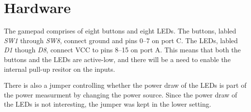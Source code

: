 \section{Hardware}
The gamepad comprises of eight buttons and eight LEDs.
The buttons, labled \emph{SW1} through \emph{SW8}, connect ground and pins 0--7 on port C.
The LEDs, labled \emph{D1} though \emph{D8}, connect VCC to pins 8--15 on port A.
This means that both the buttons and the LEDs are active-low, and there will be a need to enable the internal pull-up resitor on the inputs.

There is also a jumper controlling whether the power draw of the LEDs is part of the power measurment by changing the power source.
Since the power draw of the LEDs is not interesting, the jumper was kept in the lower setting.

